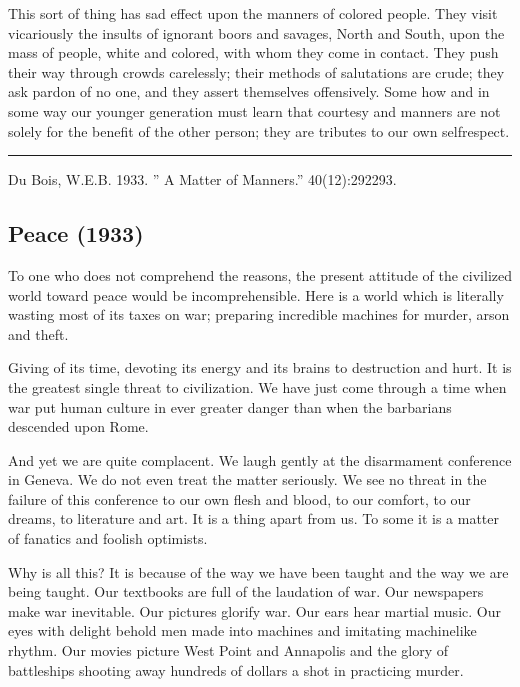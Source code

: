 \documentclass[letterpaper,10pt,english]{jupyterBook}
\begin{document}
\sphinxAtStartPar
This sort of thing has sad effect upon the manners of colored people. They visit vicariously the insults of ignorant boors and savages, North and South, upon the mass of people, white and colored, with whom they come in contact. They push their way through crowds carelessly; their methods of salutations are crude; they ask pardon of no one, and they assert themselves offensively. Some how and in some way our younger generation must learn that courtesy and manners are not solely for the benefit of the other person; they are tributes to our own self\sphinxhyphen{}respect.


\bigskip\hrule\bigskip


\sphinxAtStartPar
{} Du Bois, W.E.B. 1933. ” A Matter of Manners.”  40(12):292\sphinxhyphen{}293.


\subsection{Peace (1933)}
\label{\detokenize{Volumes/40/12/peace:peace-1933}}\label{\detokenize{Volumes/40/12/peace::doc}}
\sphinxAtStartPar
To one who does not comprehend the reasons, the present attitude of the civilized world toward peace would be incomprehensible. Here is a world which is literally wasting most of its taxes on war; preparing incredible machines for murder, arson and theft.

\sphinxAtStartPar
Giving of its time, devoting its energy and its brains to destruction and hurt. It is the greatest single threat to civilization. We have just come through a time when war put human culture in ever greater danger than when the barbarians descended upon Rome.

\sphinxAtStartPar
And yet we are quite complacent. We laugh gently at the disarmament conference in Geneva. We do not even treat the matter seriously. We see no threat in the failure of this conference to our own flesh and blood, to our comfort, to our dreams, to literature and art. It is a thing apart from us. To some it is a matter of fanatics and foolish optimists.

\sphinxAtStartPar
Why is all this? It is because of the way we have been taught and the way we are being taught. Our textbooks are full of the laudation of war. Our newspapers make war inevitable. Our pictures glorify war. Our ears hear martial music. Our eyes with delight behold men made into machines and imitating machine\sphinxhyphen{}like rhythm. Our movies picture West Point and Annapolis and the glory of battleships shooting away hundreds of dollars a shot in practicing murder.
\end{document}
